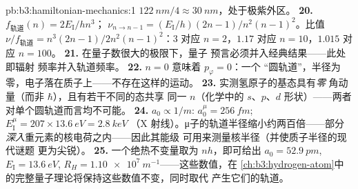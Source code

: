 \begin{solution}{pb:b3:hamiltonian-mechanics:1}
$\qty{122}{nm}/4 \approx \qty{30}{nm}$，处于极紫外区。
\textbf{20.} $f_{\text{轨道}}(n) = 2E_{\text{I}}/hn^3$；
$\nu_{n \to n-1} = (E_{\text{I}}/h)(2n - 1)/n^2(n-1)^2$。比值
$\nu/f_{\text{轨道}} = n^3(2n-1)/2n^2(n-1)^2$：$3$ 对应 $n = 2$，$1.17$
对应 $n = 10$，$1.015$ 对应 $n = 100$。
\textbf{21.} 在量子数很大的极限下，量子
预言必须并入经典结果——此处即辐射
频率并入轨道频率。
\textbf{22.} $n = 0$ 意味着 $p_\varphi = 0$：一个
“圆轨道”，半径为零，电子落在质子上——不存在这样的运动。
\textbf{23.} 实测氢原子的基态具有\emph{零}
角动量（而非 $\hbar$），且有若干不同的态共享
同一 $n$（化学中的 $s$、$p$、$d$ 形状）——两者
对单个圆轨道而言均不可能。
\textbf{24.} $a_0 \propto 1/m$: $a_0^\mu = \qty{256}{fm}$;
$E_{\text{I}}^\mu = 207 \times \qty{13.6}{eV} = \qty{2.8}{keV}$
（X 射线）。μ子的轨道半径缩小约两百倍——部分
\emph{深入}重元素的核电荷之内——因此其能级
可用来测量核半径（并使质子半径的现代谜题
更为尖锐）。
\textbf{25.} 一个绝热不变量取为 $nh$，即可给出 $a_0 =
\qty{52.9}{pm}$, $E_{\text{I}} = \qty{13.6}{eV}$, $R_H =
\qty{1.10e7}{m^{-1}}$——这些数值，在
\cref{ch:b3:hydrogen-atom}中的完整量子理论将保持这些数值不变，同时取代
产生它们的轨道。
\end{solution}
